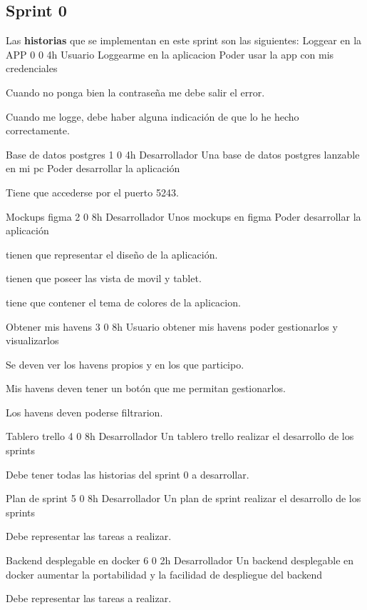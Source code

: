 \subsection{Sprint 0}
Las \textbf{historias} que se implementan en este sprint son las siguientes:
\UserStory
{Loggear en la APP}
{0}
{0}
{4h}
{Usuario}
{Loggearme en la aplicacion}
{Poder usar la app con mis credenciales}
{
\item Cuando no ponga bien la contraseña me debe salir el error.
\item Cuando me logge, debe haber alguna indicación de que lo he hecho correctamente.
}

\TechStory
{Base de datos postgres}
{1}
{0}
{4h}
{Desarrollador}
{Una base de datos postgres lanzable en mi pc}
{Poder desarrollar la aplicación}
{
\item Tiene que accederse por el puerto 5243.
}

\TechStory
{Mockups figma}
{2}
{0}
{8h}
{Desarrollador}
{Unos mockups en figma}
{Poder desarrollar la aplicación}
{
\item tienen que representar el diseño de la aplicación.
\item tienen que poseer las vista de movil y tablet.
\item tiene que contener el tema de colores de la aplicacion.
}

\UserStory
{Obtener mis havens}
{3}
{0}
{8h}
{Usuario}
{obtener mis havens}
{poder gestionarlos y visualizarlos}
{
\item Se deven ver los havens propios y en los que participo.
\item Mis havens deven tener un botón que me permitan gestionarlos.
\item Los havens deven poderse filtrarion.
}

\TechStory
{Tablero trello}
{4}
{0}
{8h}
{Desarrollador}
{Un tablero trello}
{realizar el desarrollo de los sprints}
{
\item Debe tener todas las historias del sprint 0 a desarrollar.
}

\TechStory
{Plan de sprint}
{5}
{0}
{8h}
{Desarrollador}
{Un plan de sprint}
{realizar el desarrollo de los sprints}
{
\item Debe representar las tareas a realizar.
}

\TechStory
{Backend desplegable en docker}
{6}
{0}
{2h}
{Desarrollador}
{Un backend desplegable en docker}
{aumentar la portabilidad y la facilidad de despliegue del backend}
{
\item Debe representar las tareas a realizar.
}

